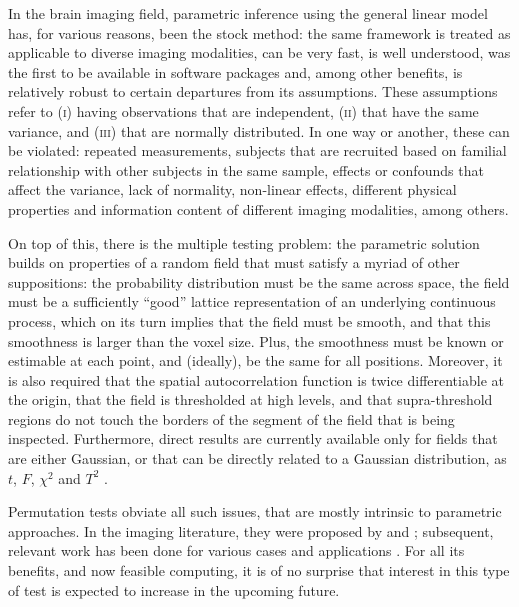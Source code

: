 In the brain imaging field, parametric inference using the general linear model \citep[\textsc{glm};][]{Scheffe1959, Searle1971, Friston1994} has, for various reasons, been the stock method: the same framework is treated as applicable to diverse imaging modalities, can be very fast, is well understood, was the first to be available in software packages and, among other benefits, is relatively robust to certain departures from its assumptions. These assumptions refer to (\textsc{i}) having observations that are independent, (\textsc{ii}) that have the same variance, and (\textsc{iii}) that are normally distributed. In one way or another, these can be violated: repeated measurements, subjects that are recruited based on familial relationship with other subjects in the same sample, effects or confounds that affect the variance, lack of normality, non-linear effects, different physical properties and information content of different imaging modalities, among others.

On top of this, there is the multiple testing problem: the parametric solution builds on properties of a random field that must satisfy a myriad of other suppositions: the probability distribution must be the same across space, the field must be a sufficiently ``good'' lattice representation of an underlying continuous process, which on its turn implies that the field must be smooth, and that this smoothness is larger than the voxel size. Plus, the smoothness must be known or estimable at each point, and (ideally), be the same for all positions. Moreover, it is also required that the spatial autocorrelation function is twice differentiable at the origin, that the field is thresholded at high levels, and that supra-threshold regions do not touch the borders of the segment of the field that is being inspected. Furthermore, direct results are currently available only for fields that are either Gaussian, or that can be directly related to a Gaussian distribution, as $t$, $F$, $\chi^2$ and $T^2$ \citep{Worsley1996, Cao1999}.

Permutation tests obviate all such issues, that are mostly intrinsic to parametric approaches. In the imaging literature, they were proposed by \citet{blair1994_thatcher} and \citet{Holmes1996}; subsequent, relevant work has been done for various cases and applications \citep{Arndt1996, Locascio1997, Brammer1997, Belmonte2001, Bullmore1996, Bullmore1999, Bullmore2001, Nichols2002, Breakspear2004, Laird2004, Suckling2004, Hayasaka2004, Meriaux2006, Eklund2012, Ge2012, Winkler2014, Winkler2016_npc, McFarquhar2016}. For all its benefits, and now feasible computing, it is of no surprise that interest in this type of test is expected to increase in the upcoming future.

